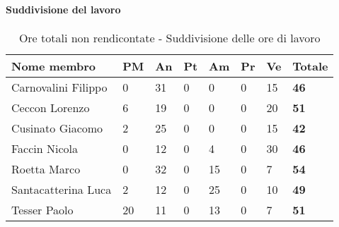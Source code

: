 			\paragraph{Suddivisione del lavoro} %
			\label{par:suddivisione_del_lavoro}
				\begin{table}[!h]
					\begin{center}
						\begin{tabularx}{0.9\textwidth}{|l|l|l|l|l|l|l|X|}
							\hline
							\textbf{Nome membro} & \textbf{PM} & \textbf{An} & \textbf{Pt} & \textbf{Am} & \textbf{Pr} & \textbf{Ve} & \textbf{Totale} \\
							\hline
							Carnovalini Filippo & 0 & 31 & 0 & 0 & 0 & 15 & \textbf{46} \\
							\hline
							Ceccon Lorenzo & 6 & 19 & 0 & 0 & 0 & 20 & \textbf{51} \\
							\hline
							Cusinato Giacomo & 2 & 25 & 0 & 0 & 0 & 15 & \textbf{42} \\
							\hline
							Faccin Nicola & 0 & 12 & 0 & 4 & 0 & 30 & \textbf{46} \\
							\hline
							Roetta Marco & 0 & 32 & 0 & 15 & 0 & 7 & \textbf{54} \\
							\hline
							Santacatterina Luca & 2 & 12 & 0 & 25 & 0 & 10 & \textbf{49} \\
							\hline
							Tesser Paolo & 20 & 11 & 0 & 13 & 0 & 7 & \textbf{51} \\
							\hline	
						\end{tabularx}
					\end{center}
				\caption{Ore totali non rendicontate - Suddivisione delle ore di lavoro}
				\end{table}
			
